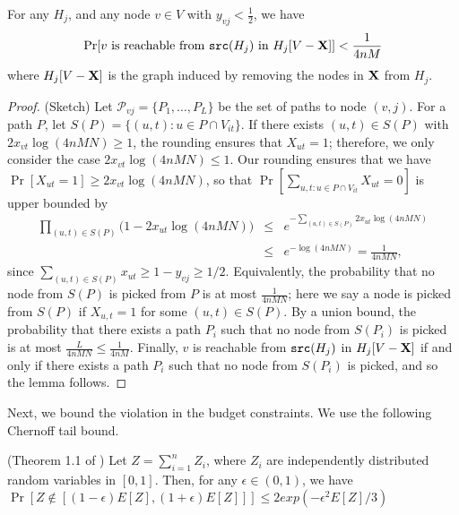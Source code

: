 \begin{lemma}
\label{lem:disconnect}
For any $H_j$, and any node $v\in V$ with $y_{vj} < \frac{1}{2}$, we have
\[
\Pr[\mbox{$v$ is reachable from $\texttt{src}(H_j)$ in $H_j[V-\mathbf{X}]$}] < \frac{1}{4nM}
\]
where $H_j[V-\mathbf{X}]$ is the graph induced by removing the nodes in $\mathbf{X}$ from $H_j$.
\end{lemma}
\begin{proof} (Sketch)
Let $\mathcal{P}_{vj} = \{P_1, \ldots,P_L\}$ be the  set of paths to node $(v,j)$. 
For a path $P$, let $S(P)=\{(u, t): u\in P\cap V_{it}\}$.
If there exists $(u, t)\in S(P)$ with $2 x_{vt} \log(4nMN) \geq 1$, the rounding ensures that $X_{ut}=1$;
therefore, we only consider the case $2 x_{vt} \log(4nMN)\leq 1$.
Our rounding ensures that we have $\Pr[X_{ut}=1] \geq 2 x_{vt} \log(4nMN)$, so that
$\Pr[\sum_{u, t: u\in P\cap V_{it}} X_{ut} = 0]$ is upper bounded by
\begin{eqnarray*}
\prod_{(u,t) \in S(P)} \big(1- 2 x_{ut} \log(4nMN)\big) &\leq& e^{-\sum_{(u, t)\in S(P)} 2 x_{ut} \log(4nMN)}\\
&\leq& e^{-\log(4nMN)}= \frac{1}{4nMN},
\end{eqnarray*}
since $\sum_{(u, t)\in S(P)} x_{ut} \geq 1-y_{vj} \geq 1/2$.
Equivalently, the probability that no node from $S(P)$ is picked from $P$ is at most $\frac{1}{4nMN}$;
here we say a node is picked from $S(P)$ if $X_{u,t}=1$ for some $(u, t)\in S(P)$.
By a union bound, the probability that there exists a path $P_i$ such that no node from
$S(P_i)$ is picked is at most $\frac{L}{4nMN}\leq \frac{1}{4nM}$.
Finally, $v$ is reachable from $\texttt{src}(H_j)$ in $H_j[V-\mathbf{X}]$ if and only if there exists a path $P_i$ such that no node from
$S(P_i)$ is picked, and so the lemma follows.
\end{proof}

Next, we bound the violation in the budget constraints. We use the following Chernoff tail bound.

\begin{theorem} (Theorem 1.1 of \cite{books/daglib/0025902})
Let $Z=\sum_{i=1}^n Z_i$, where $Z_i$ are independently distributed random variables in $[0, 1]$. Then, for any $\epsilon\in(0, 1)$, we have
$\Pr[Z\not\in[(1-\epsilon)E[Z], (1+\epsilon)E[Z]]]\leq 2 exp(-\epsilon^2 E[Z]/3)$
\end{theorem}

